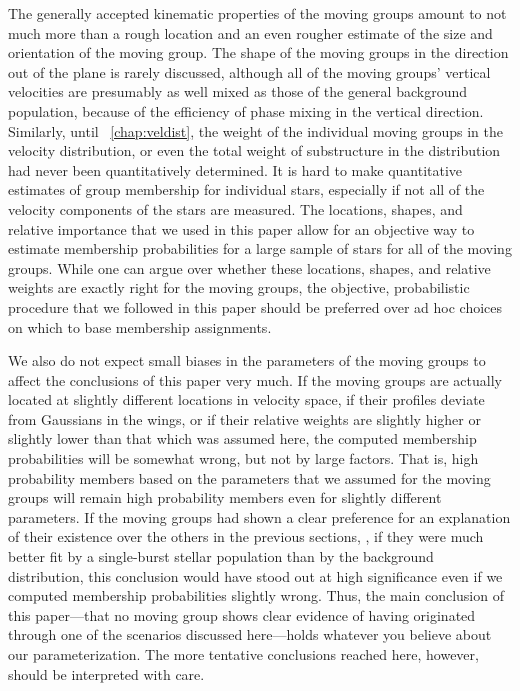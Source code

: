 The generally accepted kinematic properties of the moving groups
amount to not much more than a rough location and an even rougher
estimate of the size and orientation of the moving group. The shape of
the moving groups in the direction out of the plane is rarely
discussed, although all of the moving groups' vertical velocities are
presumably as well mixed as those of the general background
population, because of the efficiency of phase mixing in the vertical
direction. Similarly, until \chaptername~\ref{chap:veldist}, the
weight of the individual moving groups in the velocity distribution,
or even the total weight of substructure in the distribution had never
been quantitatively determined. It is hard to make quantitative
estimates of group membership for individual stars, especially if not
all of the velocity components of the stars are measured. The
locations, shapes, and relative importance that we used in this paper
allow for an objective way to estimate membership probabilities for a
large sample of stars for all of the moving groups. While one can
argue over whether these locations, shapes, and relative weights are
exactly right for the moving groups, the objective, probabilistic
procedure that we followed in this paper should be preferred over ad
hoc choices on which to base membership assignments.

We also do not expect small biases in the parameters of the moving
groups to affect the conclusions of this paper very much. If the
moving groups are actually located at slightly different locations in
velocity space, if their profiles deviate from Gaussians in the wings,
or if their relative weights are slightly higher or slightly lower
than that which was assumed here, the computed membership
probabilities will be somewhat wrong, but not by large factors. That
is, high probability members based on the parameters that we assumed
for the moving groups will remain high probability members even for
slightly different parameters. If the moving groups had shown a clear
preference for an explanation of their existence over the others in
the previous sections, \eg, if they were much better fit by a
single-burst stellar population than by the background distribution,
this conclusion would have stood out at high significance even if we
computed membership probabilities slightly wrong. Thus, the main
conclusion of this paper---that no moving group shows clear evidence
of having originated through one of the scenarios discussed
here---holds whatever you believe about our parameterization. The more
tentative conclusions reached here, however, should be interpreted
with care.

